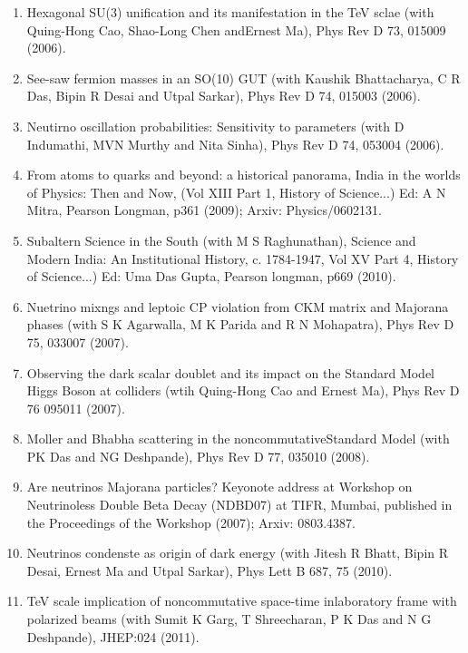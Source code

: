 \begin{enumerate}
\item Hexagonal SU(3) unification and its manifestation in the TeV sclae (with Quing-Hong Cao, Shao-Long Chen and\break Ernest Ma), Phys Rev D 73, 015009 (2006).

\item See-saw fermion masses in an SO(10) GUT (with Kaushik Bhattacharya, C R Das, Bipin R Desai and Utpal Sarkar), Phys Rev D 74, 015003 (2006).

\item Neutirno oscillation probabilities:  Sensitivity to parameters (with D Indumathi, MVN Murthy and Nita Sinha), Phys Rev D 74, 053004 (2006).

\item From atoms to quarks and beyond: a historical panorama, India in the worlds of Physics: Then and Now, (Vol XIII Part 1, History of Science...) Ed: A N Mitra, Pearson Longman, p361 (2009); Arxiv: Physics/0602131.

\item Subaltern Science in the South (with M S Raghunathan), Science and Modern India: An Institutional History, c. 1784-1947, Vol XV Part 4, History of Science...) Ed: Uma Das Gupta, Pearson longman, p669 (2010).

\item Nuetrino mixngs and leptoic CP violation from CKM matrix and Majorana phases (with S K Agarwalla, M K Parida and R N Mohapatra), Phys Rev D 75, 033007 (2007).

\item Observing the dark scalar doublet and its impact on the Standard Model Higgs Boson at colliders (wtih Quing-Hong Cao and Ernest Ma), Phys Rev D 76 095011 (2007).

\item Moller and Bhabha scattering in the noncommutative\break Standard Model (with PK Das and NG Deshpande), Phys Rev D 77, 035010 (2008).

\item Are neutrinos Majorana particles? Keyonote address at Workshop on Neutrinoless Double Beta Decay (NDBD07) at TIFR, Mumbai, published in the Proceedings of the Workshop (2007); Arxiv: 0803.4387.

\item Neutrinos condenste as origin of dark energy (with Jitesh R Bhatt, Bipin R Desai, Ernest Ma and Utpal Sarkar), Phys Lett B 687, 75 (2010).

\item TeV scale implication of noncommutative space-time in\break laboratory frame with polarized beams (with Sumit K Garg, T Shreecharan, P K Das and N G Deshpande), JHEP:024 (2011).


\end{enumerate}
